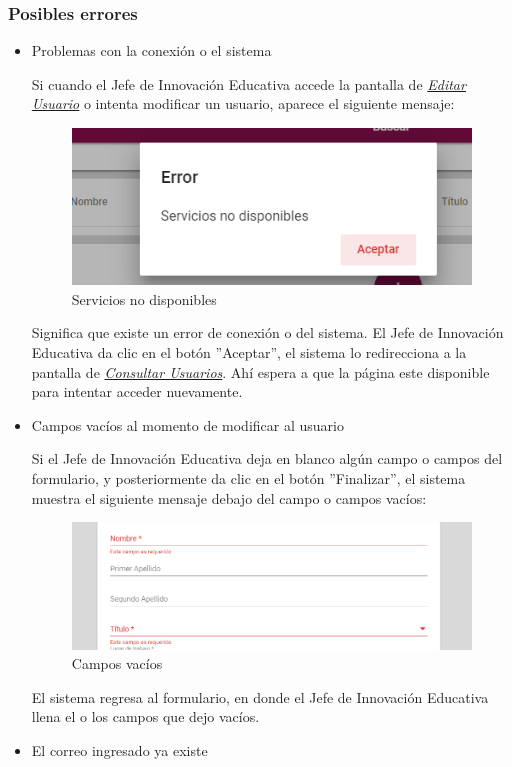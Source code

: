 \subsubsection{Posibles errores}
\begin{itemize}
	\item Problemas con la conexión o el sistema

	Si cuando el Jefe de Innovación Educativa accede la pantalla de \hyperlink{editarUs-JIE}{\textit{Editar Usuario}} o intenta modificar un usuario, aparece el siguiente mensaje:
	
	\begin{figure}[H]
		\centering
		\includegraphics[width=0.4\linewidth]{images/SP5/MSGSN}
		\caption{Servicios no disponibles}

	\end{figure}


	Significa que existe un error de conexión o del sistema. El Jefe de Innovación Educativa da clic en el botón ''Aceptar'', el sistema lo redirecciona  a la pantalla de \hyperlink{consultarUs-JIE}{\textit{Consultar Usuarios}}. Ahí  espera a que la página este disponible para intentar acceder nuevamente.

	\item Campos vacíos al momento de modificar al usuario

	Si el Jefe de Innovación Educativa deja en blanco algún campo o campos del formulario, y posteriormente da clic en el botón ''Finalizar'', el sistema muestra el siguiente mensaje debajo del campo o campos vacíos:

	\begin{figure}[H]
		\centering
		\includegraphics[width=0.4\linewidth]{images/SP5/MSG44}
		\caption{Campos vacíos}
		\label{mensaje44-JIE}

	\end{figure}

	El sistema regresa  al formulario, en donde el Jefe de Innovación Educativa llena el o los campos que dejo vacíos.
	\item El correo ingresado ya existe


\end{itemize}
